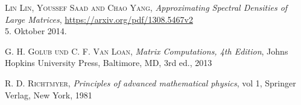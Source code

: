 \documentclass[a4paper,12pt]{report}
\theoremstyle{mydefinition}
\newcommand{\1}{\mathds{1}}
\begin{document}
\begin{thebibliography}{9}
    
    \textsc{Lin Lin, Youssef Saad and Chao Yang},
    \textit{Approximating Spectral Densities of Large Matrices},
    \url{https://arxiv.org/pdf/1308.5467v2}\\
    5. Oktober 2014.

    \textsc{G. H. Golub und C. F. Van Loan},
    \textit{Matrix Computations, 4th Edition},
    Johns Hopkins University Press,
    Baltimore, MD, 3rd ed.,
    2013

    \textsc{R. D. Richtmyer},
    \textit{Principles of advanced mathematical physics},
    vol 1, Springer Verlag,
    New York,
    1981
  
\end{thebibliography}
\end{document}

